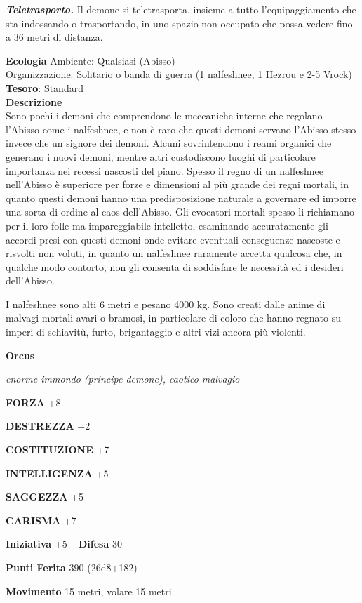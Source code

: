 \begin{multicols}{2}
\textit{\textbf{Teletrasporto.}} Il demone si teletrasporta, insieme a tutto l'equipaggiamento che sta indossando o trasportando, in uno spazio non occupato che possa vedere fino a 36 metri di distanza.

\textbf{Ecologia}
Ambiente: Qualsiasi (Abisso)\\
Organizzazione: Solitario o banda di guerra (1 nalfeshnee, 1 Hezrou e 2-5 Vrock)\\
\textbf{Tesoro}: Standard\\
\textbf{Descrizione}\\
Sono pochi i demoni che comprendono le meccaniche interne che regolano l'Abisso come i nalfeshnee, e non è raro che questi demoni servano l'Abisso stesso invece che un signore dei demoni. Alcuni sovrintendono i reami organici che generano i nuovi demoni, mentre altri custodiscono luoghi di particolare importanza nei recessi nascosti del piano. Spesso il regno di un nalfeshnee nell'Abisso è superiore per forze e dimensioni al più grande dei regni mortali, in quanto questi demoni hanno una predisposizione naturale a governare ed imporre una sorta di ordine al caos dell'Abisso. Gli evocatori mortali spesso li richiamano per il loro folle ma impareggiabile intelletto, esaminando accuratamente gli accordi presi con questi demoni onde evitare eventuali conseguenze nascoste e risvolti non voluti, in quanto un nalfeshnee raramente accetta qualcosa che, in qualche modo contorto, non gli consenta di soddisfare le necessità ed i desideri dell'Abisso.

I nalfeshnee sono alti 6 metri e pesano 4000 kg. Sono creati dalle anime di malvagi mortali avari o bramosi, in particolare di coloro che hanno regnato su imperi di schiavitù, furto, brigantaggio e altri vizi ancora più violenti.

\medskip{}\textbf{Orcus}

\textit{enorme immondo (principe demone), caotico malvagio}

\textbf{FORZA} +8

\textbf{DESTREZZA} +2

\textbf{COSTITUZIONE} +7

\textbf{INTELLIGENZA} +5

\textbf{SAGGEZZA} +5

\textbf{CARISMA} +7

\textbf{Iniziativa} +5 -- \textbf{Difesa} 30

\textbf{Punti Ferita} 390 (26d8+182)

\textbf{Movimento} 15 metri, volare 15 metri


\end{multicols}
